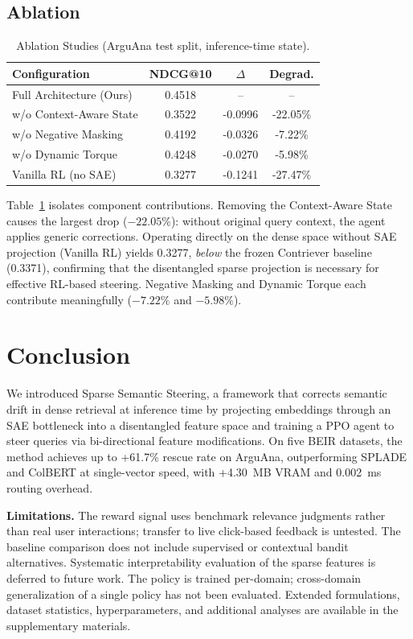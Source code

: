 \documentclass[sigconf]{acmart}
\begin{document}
\subsection{Ablation}

\begin{table}[t]
  \caption{Ablation Studies (ArguAna test split, inference-time state).}
  \label{tab:ablation}
  \begin{tabular}{lccc}
    \toprule
    Configuration & NDCG@10 & $\Delta$ & Degrad.\\
    \midrule
    Full Architecture (Ours) & 0.4518 & -- & --\\
    w/o Context-Aware State & 0.3522 & -0.0996 & -22.05\%\\
    w/o Negative Masking & 0.4192 & -0.0326 & -7.22\%\\
    w/o Dynamic Torque & 0.4248 & -0.0270 & -5.98\%\\
    Vanilla RL (no SAE) & 0.3277 & -0.1241 & -27.47\%\\
    \bottomrule
  \end{tabular}
\end{table}

Table~\ref{tab:ablation} isolates component contributions. Removing the Context-Aware State causes the largest drop ($-22.05\%$): without original query context, the agent applies generic corrections. Operating directly on the dense space without SAE projection (Vanilla RL) yields 0.3277, \textit{below} the frozen Contriever baseline (0.3371), confirming that the disentangled sparse projection is necessary for effective RL-based steering. Negative Masking and Dynamic Torque each contribute meaningfully ($-7.22\%$ and $-5.98\%$).

\section{Conclusion}

We introduced Sparse Semantic Steering, a framework that corrects semantic drift in dense retrieval at inference time by projecting embeddings through an SAE bottleneck into a disentangled feature space and training a PPO agent to steer queries via bi-directional feature modifications. On five BEIR datasets, the method achieves up to +61.7\% rescue rate on ArguAna, outperforming SPLADE and ColBERT at single-vector speed, with +4.30~MB VRAM and 0.002~ms routing overhead.

\textbf{Limitations.} The reward signal uses benchmark relevance judgments rather than real user interactions; transfer to live click-based feedback is untested. The baseline comparison does not include supervised or contextual bandit alternatives. Systematic interpretability evaluation of the sparse features is deferred to future work. The policy is trained per-domain; cross-domain generalization of a single policy has not been evaluated. Extended formulations, dataset statistics, hyperparameters, and additional analyses are available in the supplementary materials.
\end{document}

